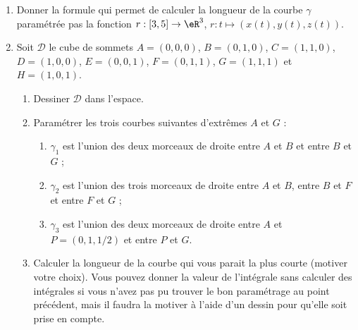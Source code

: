 \begin{exercice}\label{exoGeomAnal-0019}

  \begin{enumerate}
  \item  Donner la  formule qui permet de calculer la longueur de la courbe $\gamma$ paramétrée pas la fonction $r: [3,5]\to \eR^3$, $r: t \mapsto (x(t), y(t), z(t))$.   
\item Soit $\mathcal{D}$ le cube de sommets $A=(0,0,0)$, $B=(0,1,0)$, $C=(1,1,0)$, $D=(1,0,0)$, $E=(0,0,1)$, $F=(0,1,1)$, $G=(1,1,1)$ et $H=(1,0,1)$. 
\begin{enumerate}
\item Dessiner $\mathcal{D}$ dans l'espace. 
\item Paramétrer les trois courbes suivantes d'extrêmes $A$ et $G$ :
  \begin{enumerate}
  \item $\gamma_1$ est l'union des deux morceaux de droite entre $A$ et $B$ et entre $B$ et $G$ ;
  \item $\gamma_2$ est l'union des trois morceaux de droite entre $A$ et $B$, entre $B$ et $F$ et entre $F$ et $G$ ;
  \item $\gamma_3$ est l'union des deux morceaux de droite entre $A$ et $P=(0,1,1/2)$ et entre $P$ et $G$.
  \end{enumerate}
\item Calculer la longueur de la courbe qui vous parait la plus courte (motiver votre choix). Vous pouvez donner la valeur de l'intégrale sans calculer des intégrales si vous n'avez pas pu trouver le bon paramétrage au point précédent, mais il faudra la motiver à l'aide d'un dessin pour qu'elle soit prise en compte.

\end{enumerate}

  \end{enumerate}

\end{exercice}
